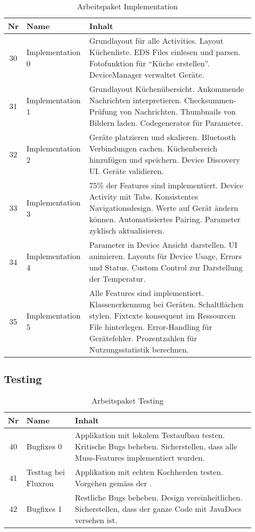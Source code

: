 \begin{table}[H]
\begin{tabularx}{\textwidth}{ c | l | X }
\textbf{Nr} & \textbf{Name} & \textbf{Inhalt} \\ \hline
30 & Implementation 0 & Grundlayout für alle Activities. Layout Küchenliste. EDS Files einlesen und parsen. Fotofunktion für \enquote{Küche erstellen}. DeviceManager verwaltet Geräte.\\ \hline
31 & Implementation 1 & Grundlayout Küchenübersicht. Ankommende Nachrichten interpretieren. Checksummen-Prüfung von Nachrichten. Thumbnails von Bildern laden. Codegenerator für Parameter.\\ \hline
32 & Implementation 2 & Geräte platzieren und skalieren. Bluetooth Verbindungen cachen. Küchenbereich hinzufügen und speichern. Device Discovery UI. Geräte validieren.\\ \hline
33 & Implementation 3 & 75\% der Features sind implementiert. Device Activity mit Tabs. Konsistentes Navigationsdesign. Werte auf Gerät ändern können. Automatisiertes Pairing. Parameter zyklisch aktualisieren. \\ \hline
34 & Implementation 4 & Parameter in Device Ansicht darstellen. UI animieren. Layouts für Device Usage, Errors und Status. Custom Control zur Darstellung der Temperatur.\\ \hline
35 & Implementation 5 & Alle Features sind implementiert. Klassenerkennung bei Geräten. Schaltflächen stylen. Fixtexte konsequent im Ressourcen File hinterlegen. Error-Handling für Gerätefehler. Prozentzahlen für Nutzungsstatistik berechnen.\\
\end{tabularx}
\caption{Arbeitspaket Implementation}
\end{table}

\subsection{Testing}

\begin{table}[H]
\begin{tabularx}{\textwidth}{ c | l | X }
\textbf{Nr} & \textbf{Name} & \textbf{Inhalt} \\ \hline
40 & Bugfixes 0 & Applikation mit lokalem Testaufbau testen. Kritische Bugs beheben. Sicherstellen, dass alle Muss-Features implementiert wurden.\\ \hline
41 & Testtag bei Fluxron & Applikation mit echten Kochherden testen. Vorgehen gemäss der \nameref{s:Systemtest_Spezifikation}. \\ \hline
42 & Bugfixes 1 & Restliche Bugs beheben. Design vereinheitlichen. Sicherstellen, dass der ganze Code mit JavaDocs versehen ist.\\ \hline
\end{tabularx}
\caption{Arbeitspaket Testing}
\end{table}

